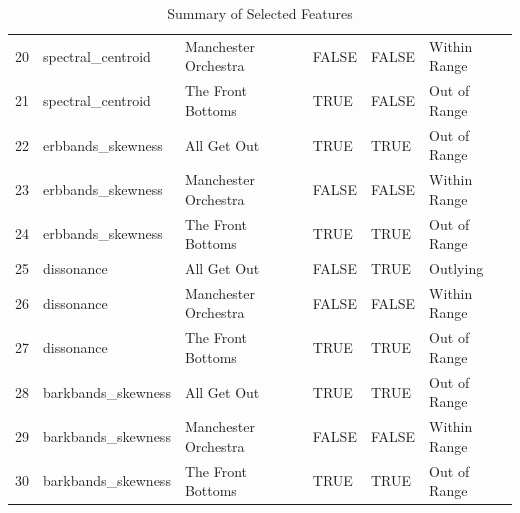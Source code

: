 \documentclass{article}\usepackage[]{graphicx}\usepackage[]{xcolor}
\begin{document}
\begin{table}[ht]
\begin{tabular}{rlllll}
  20 & spectral\_centroid & Manchester Orchestra & FALSE & FALSE & Within Range \\ 
  21 & spectral\_centroid & The Front Bottoms & TRUE & FALSE & Out of Range \\ 
  22 & erbbands\_skewness & All Get Out & TRUE & TRUE & Out of Range \\ 
  23 & erbbands\_skewness & Manchester Orchestra & FALSE & FALSE & Within Range \\ 
  24 & erbbands\_skewness & The Front Bottoms & TRUE & TRUE & Out of Range \\ 
  25 & dissonance & All Get Out & FALSE & TRUE & Outlying \\ 
  26 & dissonance & Manchester Orchestra & FALSE & FALSE & Within Range \\ 
  27 & dissonance & The Front Bottoms & TRUE & TRUE & Out of Range \\ 
  28 & barkbands\_skewness & All Get Out & TRUE & TRUE & Out of Range \\ 
  29 & barkbands\_skewness & Manchester Orchestra & FALSE & FALSE & Within Range \\ 
  30 & barkbands\_skewness & The Front Bottoms & TRUE & TRUE & Out of Range \\ 
   \hline
\end{tabular}
\endgroup
\caption{Summary of Selected Features} 
\end{table}
\end{document}
